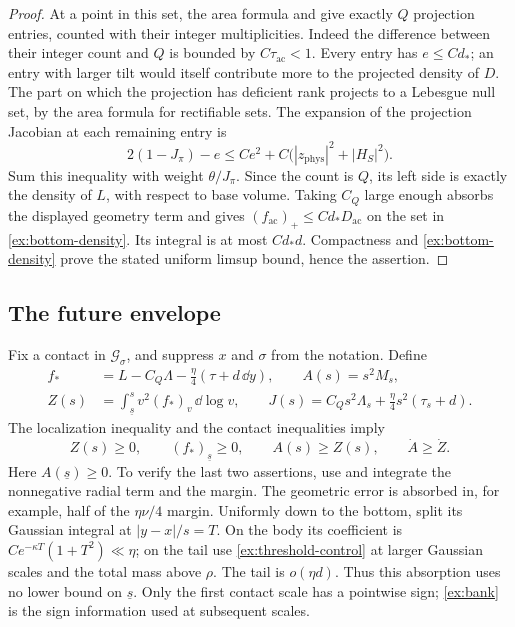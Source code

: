 \begin{proof}
At a point in this set, the area formula and 
give exactly \(Q\) projection entries, counted with their integer
multiplicities. Indeed the difference between their integer count and
\(Q\) is bounded by \(C\tau_{\mathrm{ac}}<1\).
Every entry has \(e\le Cd_*\); an entry with larger tilt would itself
contribute more to the projected density of \(D\). The part on which
the projection has deficient rank projects to a Lebesgue null set,
by the area formula for rectifiable sets.
The expansion of the projection Jacobian at each remaining entry is
\[
 2(1-J_\pi)-e
 \le Ce^2+C\bigl(|z_{\mathrm{phys}}|^2+|H_S|^2\bigr).
\]
Sum this inequality with weight \(\theta/J_\pi\). Since the count is
\(Q\), its left side is exactly the density of \(L\), with respect to
base volume. Taking \(C_Q\) large enough absorbs the displayed
geometry term and gives
\((f_{\mathrm{ac}})_+\le Cd_*D_{\mathrm{ac}}\) on the set in
\eqref{ex:bottom-density}. Its integral is at most \(Cd_*d\).
Compactness and \eqref{ex:bottom-density} prove the stated uniform
limsup bound, hence the assertion.
\end{proof}

\subsection{The future envelope}

Fix a contact in \(\mathcal G_\sigma\), and suppress \(x\) and
\(\sigma\) from the notation. Define
\begin{equation}
 \begin{split}
 f_*&=L-C_Q\Lambda-\frac\eta4(\tau+d\,\dd y),\qquad
 A(s)=s^2M_s,\\
 Z(s)&=\int_{\underline s}^{s}v^2(f_*)_v\,\dd\log v,
 \qquad
 J(s)=C_Qs^2\Lambda_s+\frac\eta4s^2(\tau_s+d).
 \end{split}
 \label{ex:path-variables}
\end{equation}
The localization inequality and the contact inequalities imply
\begin{equation}
 Z(s)\ge0,\qquad (f_*)_{\underline s}\ge0,\qquad
 A(s)\ge Z(s),\qquad \dot A\ge\dot Z.
 \label{ex:bank}
\end{equation}
Here \(A(\underline s)\ge0\). To verify the last two assertions, use
 and integrate the nonnegative radial term and the
margin. The geometric error is absorbed in, for example, half of the
\(\eta\nu/4\) margin. Uniformly down to the bottom, split its
Gaussian integral at \(|y-x|/s=T\). On the body its coefficient is
\(Ce^{-\kappa T}(1+T^2)\ll\eta\); on the tail use
\eqref{ex:threshold-control} at larger Gaussian scales and the total
mass above \(\rho\). The tail is \(o(\eta d)\).
Thus this absorption uses no lower bound on \(\underline s\).
Only the first contact scale has a pointwise sign; \eqref{ex:bank}
is the sign information used at subsequent scales.

